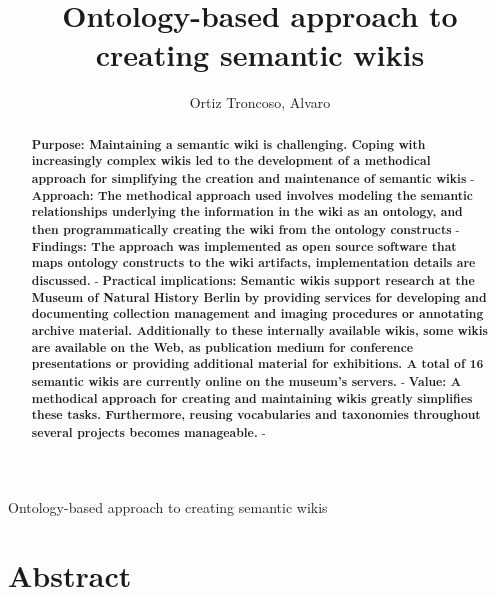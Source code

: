 \documentclass{ijcs_template}
\begin{document}
%
%

{Ontology-based approach to creating semantic wikis}

\title{Ontology-based approach to creating semantic wikis}

\author{Ortiz Troncoso, Alvaro}

\address{Museum f\"ur Naturkunde - Leibniz Institute for Research on Evolution and Biodiversity, Invalidenstrasse 43, 10115 Berlin, Germany 
}

\maketitle

\begin{history}
\end{history}

\section*{Abstract}
\begin{abstract}
\newline\textbf{Purpose: Maintaining a semantic wiki is challenging. Coping with increasingly complex wikis led to the development of a methodical approach for simplifying the creation and maintenance of semantic wikis} - 
\newline\textbf{Approach: The methodical approach used involves modeling the semantic relationships underlying the information in the wiki as an ontology, and then programmatically creating the wiki from the ontology constructs} - 
\newline\textbf{Findings: The approach was implemented as open source software that maps ontology constructs to the wiki artifacts, implementation details are discussed.} - 
\newline\textbf{Practical implications: Semantic wikis support research at the Museum of Natural History Berlin by providing services for developing and documenting collection management and imaging procedures or annotating archive material. Additionally to these internally available wikis, some wikis are available on the Web, as publication medium for conference presentations or providing additional material for exhibitions. A total of 16 semantic wikis are currently online on the museum's servers.} - 
\newline\textbf{Value: A methodical approach for creating and maintaining wikis greatly simplifies these tasks. Furthermore, reusing vocabularies and taxonomies throughout several projects becomes manageable.} -

\end{abstract}
\end{document}
